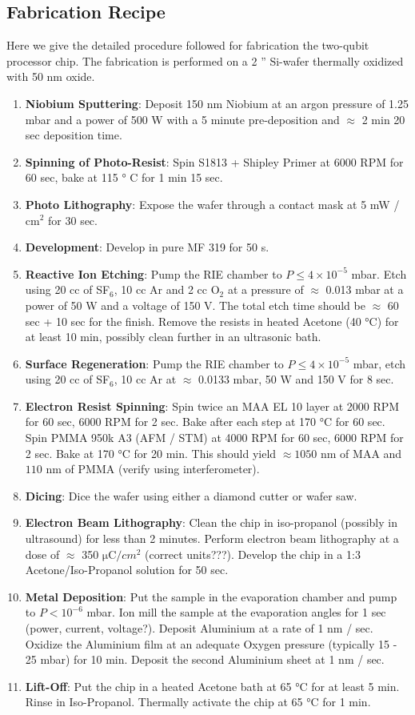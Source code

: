 \subsection{Fabrication Recipe}

Here we give the detailed procedure followed for fabrication the two-qubit processor chip. The fabrication is performed on a 2 '' Si-wafer thermally oxidized with 50 nm oxide.

\begin{enumerate}
\item \textbf{Niobium Sputtering}: Deposit 150 nm Niobium at an argon pressure of 1.25 mbar and a power of 500 W with a 5 minute pre-deposition and $\approx$ 2 min 20 sec deposition time.
\item \textbf{Spinning of Photo-Resist}: Spin S1813 + Shipley Primer at 6000 RPM for 60 sec, bake at 115 ° C for 1 min 15 sec.
\item \textbf{Photo Lithography}: Expose the wafer through a contact mask at 5 mW / cm$^2$ for 30 sec.
\item \textbf{Development}: Develop in pure MF 319 for 50 s.
\item \textbf{Reactive Ion Etching}: Pump the RIE chamber to $P\le 4\times 10^{-5}$ mbar. Etch using 20 cc of SF$_6$, 10 cc Ar and 2 cc O$_2$ at a pressure of $\approx$ 0.013 mbar at a power of 50 W and a voltage of 150 V. The total etch time should be $\approx $ 60 sec + 10 sec for the finish. Remove the resists in heated Acetone (40 °C) for at least 10 min, possibly clean further in an ultrasonic bath.
\item \textbf{Surface Regeneration}: Pump the RIE chamber  to $P\le 4\times 10^{-5}$ mbar, etch using 20 cc of SF$_6$, 10 cc Ar at $\approx$ 0.0133 mbar, 50 W and 150 V for 8 sec.
\item \textbf{Electron Resist Spinning}: Spin twice an MAA EL 10 layer at 2000 RPM for 60 sec, 6000 RPM for 2 sec. Bake after each step at 170 °C for 60 sec. Spin PMMA 950k A3 (AFM / STM) at 4000 RPM for 60 sec, 6000 RPM for 2 sec. Bake at 170 °C for 20 min. This should yield $\approx 1050$ nm of MAA and $110$ nm of PMMA (verify using interferometer).
\item \textbf{Dicing}: Dice the wafer using either a diamond cutter or wafer saw.
\item \textbf{Electron Beam Lithography}: Clean the chip in iso-propanol (possibly in ultrasound) for less than 2 minutes. Perform electron beam lithography at a dose of $\approx$ 350 $\mathrm{\mu C}/cm^2$ (correct units???). Develop the chip in a 1:3 Acetone/Iso-Propanol solution for 50 sec.
\item \textbf{Metal Deposition}: Put the sample in the evaporation chamber and pump to $P<10^{-6}$ mbar. Ion mill the sample at the evaporation angles for 1 sec (power, current, voltage?). Deposit Aluminium at a rate of 1 nm / sec. Oxidize the Aluminium film at an adequate Oxygen pressure (typically 15 - 25 mbar) for 10 min. Deposit the second Aluminium sheet at 1 nm / sec.
\item \textbf{Lift-Off}: Put the chip in a heated Acetone bath at 65 °C for at least 5 min. Rinse in Iso-Propanol. Thermally activate the chip at 65 °C for 1 min.


\end{enumerate}
